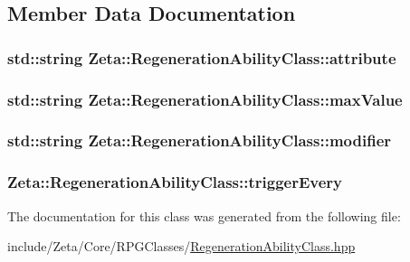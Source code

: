 \subsection{Member Data Documentation}
\hypertarget{classZeta_1_1RegenerationAbilityClass_a71b59a691f2408177894f1f84d14e121}{
\subsubsection[{attribute}]{\setlength{\rightskip}{0pt plus 5cm}std\+::string Zeta\+::\+Regeneration\+Ability\+Class\+::attribute\hspace{0.3cm}{\ttfamily [private]}}}\label{classZeta_1_1RegenerationAbilityClass_a71b59a691f2408177894f1f84d14e121}
\hypertarget{classZeta_1_1RegenerationAbilityClass_a845194fe275b7911aff30ee70c0aeb02}{
\subsubsection[{max\+Value}]{\setlength{\rightskip}{0pt plus 5cm}std\+::string Zeta\+::\+Regeneration\+Ability\+Class\+::max\+Value\hspace{0.3cm}{\ttfamily [private]}}}\label{classZeta_1_1RegenerationAbilityClass_a845194fe275b7911aff30ee70c0aeb02}
\hypertarget{classZeta_1_1RegenerationAbilityClass_a0e836c289e8d4631ca995fe3d5223671}{
\subsubsection[{modifier}]{\setlength{\rightskip}{0pt plus 5cm}std\+::string Zeta\+::\+Regeneration\+Ability\+Class\+::modifier\hspace{0.3cm}{\ttfamily [private]}}}\label{classZeta_1_1RegenerationAbilityClass_a0e836c289e8d4631ca995fe3d5223671}
\hypertarget{classZeta_1_1RegenerationAbilityClass_a0f0ae20d7223b9a9bf20e3d20500f653}{
\subsubsection[{trigger\+Every}]{ Zeta\+::\+Regeneration\+Ability\+Class\+::trigger\+Every\hspace{0.3cm}{\ttfamily [private]}}}\label{classZeta_1_1RegenerationAbilityClass_a0f0ae20d7223b9a9bf20e3d20500f653}


The documentation for this class was generated from the following file\+:\begin{DoxyCompactItemize}
\item 
include/\+Zeta/\+Core/\+R\+P\+G\+Classes/\hyperlink{RegenerationAbilityClass_8hpp}{Regeneration\+Ability\+Class.\+hpp}\end{DoxyCompactItemize}
